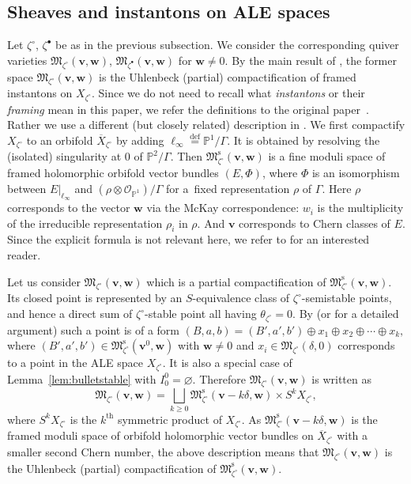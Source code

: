 \documentclass[10pt,a4paper]{amsart}
\theoremstyle{definition}
\numberwithin{equation}{section}
\newcommand{\lemref}[1]{Lemma~\ref{#1}}
\newcommand{\defeq}{\overset{\operatorname{\scriptstyle def}}{=}}
\newcommand{\proj}{{\mathbb P}}
\newcommand{\M}{{\mathfrak M}} %
\newcommand{\Mreg}{\M^{\operatorname{s}}}
\newcommand{\bv}{{\mathbf v}} %
\newcommand{\bw}{{\mathbf w}} %
\newcommand{\shfO}{\mathcal O}
\newcommand{\linf}{\ell_\infty}
\begin{document}
\subsection{Sheaves and instantons on ALE spaces}\label{subsec:sheaf}

Let $\zeta^\circ$, $\zeta^\bullet$ be as in the previous subsection.
We consider the corresponding quiver varieties
$\M_{\zeta^\circ}(\bv,\bw)$, $\M_{\zeta^\bullet}(\bv,\bw)$ for
$\bw\neq 0$.
%
By the main result of \cite{KN}, the former space
$\M_{\zeta^\circ}(\bv,\bw)$ is the Uhlenbeck (partial)
compactif\/ication of framed instantons on $X_{\zeta^\circ}$. Since we
do not need to recall what {\it instantons\/} or their {\it framing\/}
mean in this paper, we refer the def\/initions to the original paper~\cite{KN}.
%
Rather we use a dif\/ferent (but closely related) description in
\cite{Na-ADHM}. We f\/irst compactify $X_{\zeta^\circ}$ to an orbifold
$\overline{X}_{\zeta^\circ}$ by adding $\linf \defeq \proj^1/\Gamma$.
It is obtained by resolving the (isolated) singularity at $0$ of
$\proj^2/\Gamma$. Then $\Mreg_{\zeta^\circ}(\bv,\bw)$ is a f\/ine moduli
space of framed holomorphic orbifold vector bundles $(E,\Phi)$, where
$\Phi$ is an isomorphism between $E|_{\linf}$ and
$(\rho\otimes\shfO_{\proj^1})/\Gamma$ for a~f\/ixed representation
$\rho$ of $\Gamma$. Here $\rho$ corresponds to the vector $\bw$ via
the McKay correspondence: $w_i$ is the multiplicity of the irreducible
representation $\rho_i$ in $\rho$. And $\bv$ corresponds to Chern
classes of $E$. Since the explicit formula is not relevant here, we
refer to \cite[(1.9)]{Na-ADHM} for an interested reader.

Let us consider $\M_{\zeta^\circ}(\bv,\bw)$ which is a partial
compactif\/ication of $\Mreg_{\zeta^\circ}(\bv,\bw)$. Its closed point
is represented by an $S$-equivalence class of
$\zeta^\circ$-semistable points, and hence a direct sum of
$\zeta^\circ$-stable point all having $\theta_{\zeta^\circ} = 0$.
%
By \cite[Proposition~9.2(ii)]{KN} (or \cite[4.3]{Na-ADHM} for a detailed
argument) such a point is of a form
\(
    (B,a,b) = (B',a',b')\oplus x_1 \oplus x_2 \oplus \cdots \oplus x_k,
\)
where $(B',a',b')\in\Mreg_{\zeta^\circ}(\bv^0,\bw)$ with $\bw\neq 0$ and
$x_i\in\M_{\zeta^\circ}(\delta,0)$ corresponds to a point in the ALE
space $X_{\zeta^\circ}$.
%
It is also a special case of \lemref{lem:bulletstable} with $I_0^0 =
\varnothing$.
%
Therefore $\M_{\zeta^\circ}(\bv,\bw)$ is written as
\begin{equation}\label{eq:Uhzetacirc}
  \M_{\zeta^\circ}(\bv,\bw)
= \bigsqcup_{k\ge 0} \Mreg_{\zeta^\circ}(\bv-k\delta,\bw)
  \times S^k X_{\zeta^\circ},
\end{equation}
where $S^k X_{\zeta^\circ}$ is the $k^{\mathrm{th}}$ symmetric product
of $X_{\zeta^\circ}$.
%
As $\Mreg_{\zeta^\circ}(\bv-k\delta,\bw)$ is the framed moduli space
of orbifold holomorphic vector bundles on $\overline{X}_{\zeta^\circ}$
with a smaller second Chern number, the above description means that
$\M_{\zeta^\circ}(\bv,\bw)$ is the Uhlenbeck (partial)
compactif\/ication of $\Mreg_{\zeta^\circ}(\bv,\bw)$.
\end{document}
